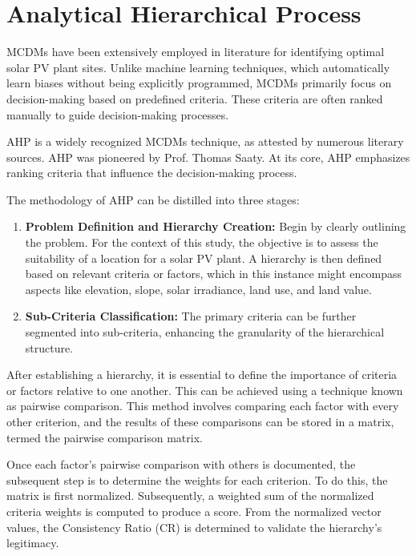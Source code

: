 \documentclass[a4paper,12pt]{Classes/RoboticsLaTeX}
\begin{document}
	\section{Analytical Hierarchical Process}

	\ac{MCDMs} have been extensively employed in literature for identifying optimal solar PV plant sites. 
	Unlike machine learning techniques, which automatically learn biases without being explicitly programmed, \ac{MCDMs} primarily focus on decision-making based on predefined criteria. 
	These criteria are often ranked manually to guide decision-making processes.

	\ac{AHP} is a widely recognized \ac{MCDMs} technique, as attested by numerous literary sources\cite{colak2020,saraswat2021,garni2017,zoghi2017}. 
	\ac{AHP} was pioneered by Prof. Thomas Saaty\cite{saaty1988}. At its core, \ac{AHP} emphasizes ranking criteria that influence the decision-making process. 

	The methodology of \ac{AHP} can be distilled into three stages:

	\begin{enumerate}
		\item \textbf{Problem Definition and Hierarchy Creation:} Begin by clearly outlining the problem. For the context of this study, the objective is to assess the suitability of a location for a solar PV plant. A hierarchy is then defined based on relevant criteria or factors, which in this instance might encompass aspects like elevation, slope, solar irradiance, land use, and land value.
		
		\item \textbf{Sub-Criteria Classification:} The primary criteria can be further segmented into sub-criteria, enhancing the granularity of the hierarchical structure.
		
	\end{enumerate}

	After establishing a hierarchy, it is essential to define the importance of criteria or factors relative to one another. This can be achieved using a technique known as 
	pairwise comparison. This method involves comparing each factor with every other criterion, and the results of these comparisons can be stored in a matrix, termed the 
	pairwise comparison matrix.

	Once each factor's pairwise comparison with others is documented, the subsequent step is to determine the weights for each criterion. To do this, the matrix is first normalized. 
	Subsequently, a weighted sum of the normalized criteria weights is computed to produce a score. From the normalized vector values, the Consistency Ratio (CR) is determined to 
	validate the hierarchy's legitimacy.
\end{document}
